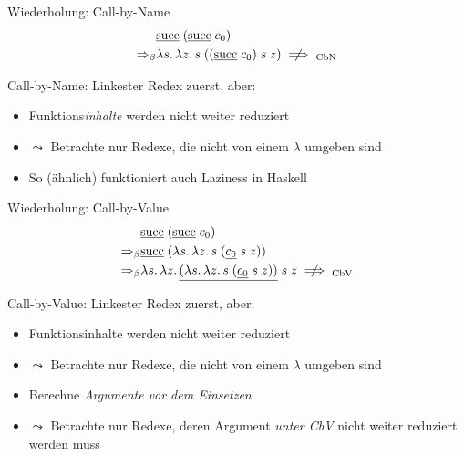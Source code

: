 \documentclass{beamer}
\begin{document}
\begin{frame}{Wiederholung: Call-by-Name}
    \begin{eqnarray*}
      &
      \app{
        \uline{\csucc}
      }{
        (\app{\uline{\csucc}}{\cn{0}})
      } \\
      \Rightarrow_\beta&
      \lam{s}{\lam{z}{\app{s}{(\app{\app{(\app{\uline{\csucc}}{\cn{0}})}{s}}{z})}}} \centernot\implies_{\text{CbN}}
    \end{eqnarray*}

    \vfill

    Call-by-Name: Linkester Redex zuerst, aber:

    \begin{itemize}
      \item Funktions\emph{inhalte} werden nicht weiter reduziert
      \item $\leadsto$ Betrachte nur Redexe, die nicht von einem $\lambda$ umgeben sind
      \item So (ähnlich) funktioniert auch Laziness in Haskell
    \end{itemize}
\end{frame}

\begin{frame}{Wiederholung: Call-by-Value}
    \begin{eqnarray*}
      &
      \app{
        \uline{\csucc}
      }{
        (\app{\uline{\csucc}}{\cn{0}})
      } \\
      \Rightarrow_\beta&
      \app{
        \uline{\csucc}
      }{
        (\lam{s}{\lam{z}{
          \app{s}{
            (\app{\app{\uline{\cn{0}}}{s}}{z})
          }
        }})
      } \\
      \Rightarrow_\beta&
      \lam{s}{\lam{z}{
      \app{\app{
        \uline{(\lam{s}{\lam{z}{
          \app{s}{
            (\app{\app{\uline{\cn{0}}}{s}}{z})
          }
        }})}
      }{s}}{z}
      }} \centernot\implies_\text{CbV}
    \end{eqnarray*}
    \vfill

    Call-by-Value: Linkester Redex zuerst, aber:

    \begin{itemize}
      \item Funktionsinhalte werden nicht weiter reduziert
      \item $\leadsto$ Betrachte nur Redexe, die nicht von einem $\lambda$ umgeben sind
      \item Berechne \emph{Argumente vor dem Einsetzen}
      \item $\leadsto$ Betrachte nur Redexe, deren Argument \emph{unter CbV} nicht weiter reduziert werden muss
    \end{itemize}
\end{frame}
\end{document}
